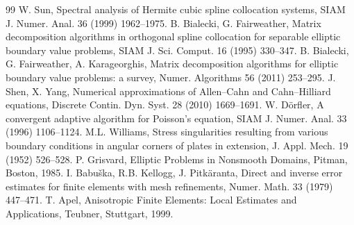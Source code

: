\documentclass[preprint,12pt]{elsarticle}
\theoremstyle{remark}
\begin{document}
\begin{thebibliography}{99}
 W. Sun, Spectral analysis of Hermite cubic spline collocation systems, SIAM J. Numer. Anal. 36 (1999) 1962--1975.
 B. Bialecki, G. Fairweather, Matrix decomposition algorithms in orthogonal spline collocation for separable elliptic boundary value problems, SIAM J. Sci. Comput. 16 (1995) 330--347.
 B. Bialecki, G. Fairweather, A. Karageorghis, Matrix decomposition algorithms for elliptic boundary value problems: a survey, Numer. Algorithms 56 (2011) 253--295.
 J. Shen, X. Yang, Numerical approximations of Allen--Cahn and Cahn--Hilliard equations, Discrete Contin. Dyn. Syst. 28 (2010) 1669--1691.
 W. D\"orfler, A convergent adaptive algorithm for Poisson's equation, SIAM J. Numer. Anal. 33 (1996) 1106--1124.
 M.L. Williams, Stress singularities resulting from various boundary conditions in angular corners of plates in extension, J. Appl. Mech. 19 (1952) 526--528.
 P. Grisvard, Elliptic Problems in Nonsmooth Domains, Pitman, Boston, 1985.
 I. Babu\v{s}ka, R.B. Kellogg, J. Pitk\"aranta, Direct and inverse error estimates for finite elements with mesh refinements, Numer. Math. 33 (1979) 447--471.
 T. Apel, Anisotropic Finite Elements: Local Estimates and Applications, Teubner, Stuttgart, 1999.
\end{thebibliography}
\end{document}
